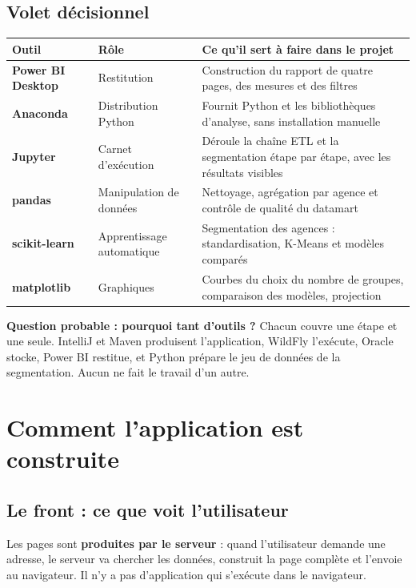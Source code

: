 \documentclass[a4paper,11pt]{article}
\begin{document}
\subsection{Volet décisionnel}

\noindent\begin{tabularx}{\textwidth}{|>{\bfseries}L{3.8cm}|L{3.4cm}|X|}
\hline
\textmd{\textbf{Outil}} & \textbf{Rôle} & \textbf{Ce qu'il sert à faire dans le projet}\\
\hline
Power BI Desktop & Restitution & Construction du rapport de quatre pages, des mesures et des filtres\\
\hline
Anaconda & Distribution Python & Fournit Python et les bibliothèques d'analyse, sans installation manuelle\\
\hline
Jupyter & Carnet d'exécution & Déroule la chaîne ETL et la segmentation étape par étape, avec les résultats visibles\\
\hline
pandas & Manipulation de données & Nettoyage, agrégation par agence et contrôle de qualité du datamart\\
\hline
scikit-learn & Apprentissage automatique & Segmentation des agences : standardisation, K-Means et modèles comparés\\
\hline
matplotlib & Graphiques & Courbes du choix du nombre de groupes, comparaison des modèles, projection\\
\hline
\end{tabularx}

\begin{retenir}
\textbf{Question probable : pourquoi tant d'outils ?} Chacun couvre une étape et
une seule. IntelliJ et Maven produisent l'application, WildFly l'exécute, Oracle
stocke, Power BI restitue, et Python prépare le jeu de données de la
segmentation. Aucun ne fait le travail d'un autre.
\end{retenir}

\section{Comment l'application est construite}

\subsection{Le front : ce que voit l'utilisateur}

Les pages sont \textbf{produites par le serveur} : quand l'utilisateur demande
une adresse, le serveur va chercher les données, construit la page complète et
l'envoie au navigateur. Il n'y a pas d'application qui s'exécute dans le
navigateur.
\end{document}
